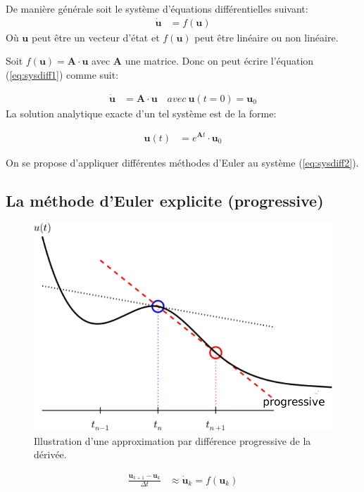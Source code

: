 \documentclass[%
oneside,                 %
final,                   %
10pt]{article}
\begin{document}
De manière générale soit le système d'équations différentielles suivant:
\label{eq:sysdiff1}
\begin{align}
\pmb{\dot{u}} &= f(\pmb{u})
\end{align}
Où $\pmb{u}$ peut être un vecteur d'état et $f(\pmb{u})$ peut être linéaire ou non linéaire.

Soit $f(\pmb{u}) = \pmb{A} \cdot \pmb{u}$ avec $\pmb{A}$ une matrice. Donc on peut écrire l'équation (\ref{eq:sysdiff1}) comme suit:

\label{eq:sysdiff2}
\begin{align}
\pmb{\dot{u}} &= \pmb{A} \cdot \pmb{u} \quad avec \ \pmb{u}(t=0)=\pmb{u}_0
\end{align}
La solution analytique exacte d'un tel système est de la forme:

\label{eq:solexact1}
\begin{align}
\pmb{u}(t) &= e^{\pmb{A}t} \cdot \pmb{u}_0
\end{align}

On se propose d'appliquer différentes méthodes d'Euler au système (\ref{eq:sysdiff2}).

\subsection{La méthode d'Euler explicite (progressive)}


\begin{figure}[!ht]  %
  \centerline{\includegraphics[width=0.7\linewidth]{imgs/fd_forward.pdf}}
  \caption{
  Illustration d'une approximation par différence progressive de la dérivée.
  }
\end{figure}


\begin{align}
\frac{\pmb{u}_{k+1}-\pmb{u}_k}{\Delta t} &\approx \pmb{\dot{u}}_k = f(\pmb{u}_k)
\end{align}
\end{document}
